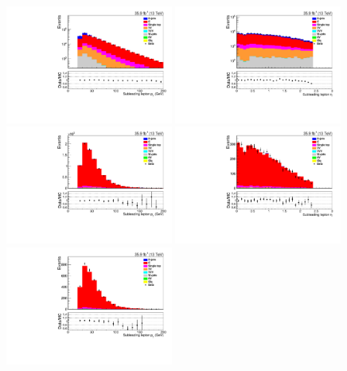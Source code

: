 \begin{figure}[ht]
\centering
\includegraphics[width=0.49\textwidth]{figs/background-estimation/plots/unblinded/ttbar_control/lep2Pt_SingleTop_lepSel_emu_log.pdf}
\includegraphics[width=0.49\textwidth]{figs/background-estimation/plots/unblinded/ttbar_control/lep2Eta_SingleTop_lepSel_emu_log.pdf}
\\
\includegraphics[width=0.49\textwidth]{figs/background-estimation/plots/unblinded/ttbar_control/lep2Pt_SingleTop_jetSel_emu.pdf}
\includegraphics[width=0.49\textwidth]{figs/background-estimation/plots/unblinded/ttbar_control/lep2Eta_SingleTop_jetSel_emu.pdf}
\\
\includegraphics[width=0.49\textwidth]{figs/background-estimation/plots/unblinded/ttbar_control/lep2Pt_SingleTop_wMass_emu.pdf}

\end{figure}
